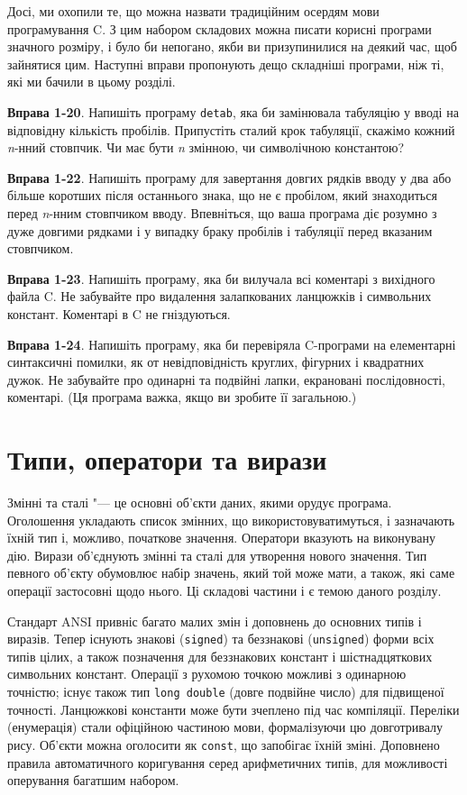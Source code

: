 \documentclass[a4paper,12pt]{book}
\begin{document}
  Досі, ми охопили те, що можна назвати традиційним осердям мови програмування C. З цим
  набором складових можна писати корисні програми значного розміру, і було би непогано,
  якби ви призупинилися на деякий час, щоб зайнятися цим. Наступні вправи пропонують дещо
  складніші програми, ніж ті, які ми бачили в цьому розділі.

  \textbf{Вправа 1-20}. Напишіть програму \texttt{detab}, яка би замінювала табуляцію у
  вводі на відповідну кількість пробілів. Припустіть сталий крок табуляції, скажімо кожний
  \textit{n}-нний стовпчик. Чи має бути \textit{n} змінною, чи символічною константою?

  \textbf{Вправа 1-22}. Напишіть програму для завертання довгих рядків вводу у два або
  більше коротших після останнього знака, що не є пробілом, який знаходиться перед
  \textit{n}-нним стовпчиком вводу. Впевніться, що ваша програма діє розумно з дуже довгими
  рядками і у випадку браку пробілів і табуляції перед вказаним стовпчиком.

  \textbf{Вправа 1-23}. Напишіть програму, яка би вилучала всі коментарі з вихідного файла
  C. Не забувайте про видалення залапкованих ланцюжків і символьних констант. Коментарі в
  C не гніздуються.

  \textbf{Вправа 1-24}. Напишіть програму, яка би перевіряла C-програми на елементарні
  синтаксичні помилки, як от невідповідність круглих, фігурних і квадратних дужок. Не
  забувайте про одинарні та подвійні лапки, екрановані послідовності, коментарі. (Ця
  програма важка, якщо ви зробите її загальною.)

\chapter{Типи, оператори та вирази}

\label{f0:ch2}
  Змінні та сталі "--- це основні об'єкти даних, якими орудує програма. Оголошення
  укладають список змінних, що використовуватимуться, і зазначають їхній тип і, можливо,
  початкове значення. Оператори вказують на виконувану дію. Вирази об'єднують змінні та
  сталі для утворення нового значення. Тип певного об'єкту обумовлює набір значень, який
  той може мати, а також, які саме операції застосовні щодо нього. Ці складові частини і є
  темою даного розділу.

  Стандарт ANSI привніс багато малих змін і доповнень до основних типів і виразів. Тепер
  існують знакові (\texttt{signed}) та беззнакові (\texttt{unsigned}) форми всіх типів
  цілих, а також позначення для беззнакових констант і шістнадцяткових символьних
  констант. Операції з рухомою точкою можливі з одинарною точністю; існує також тип
  \texttt{long double} (довге подвійне число) для підвищеної точності. Ланцюжкові
  константи може бути зчеплено під час компіляції. Переліки (енумерація) стали офіційною
  частиною мови, формалізуючи цю довготривалу рису. Об'єкти можна оголосити як
  \texttt{const}, що запобігає їхній зміні. Доповнено правила автоматичного коригування
  серед арифметичних типів, для можливості оперування багатшим набором.
\end{document}

